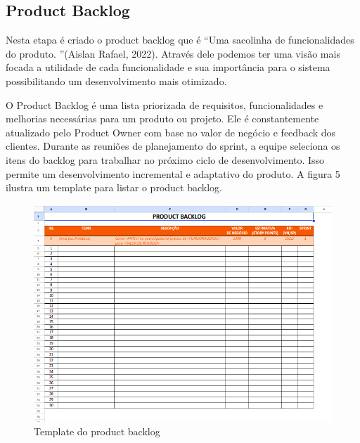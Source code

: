 \documentclass[12pt]{article}
\begin{document}
\subsection{Product Backlog}
Nesta etapa é criado o product backlog que é “Uma sacolinha de
funcionalidades do produto. ”(Aislan Rafael, 2022). Através dele podemos ter uma visão mais focada a utilidade de cada funcionalidade e sua importância para o sistema possibilitando um desenvolvimento mais otimizado. 

O Product Backlog é uma lista priorizada de requisitos, funcionalidades e melhorias necessárias para um produto ou projeto. Ele é constantemente atualizado pelo Product Owner com base no valor de negócio e feedback dos clientes. Durante as reuniões de planejamento do sprint, a equipe seleciona os itens do backlog para trabalhar no próximo ciclo de desenvolvimento. Isso permite um desenvolvimento incremental e adaptativo do produto. A figura 5 ilustra um template para listar o product backlog.

\begin{figure}[H]
\centering
\includegraphics[width=.8\textwidth]{product.png}
\caption{Template do product backlog}
\label{fig:typical-figure}
\end{figure}
\end{document}
